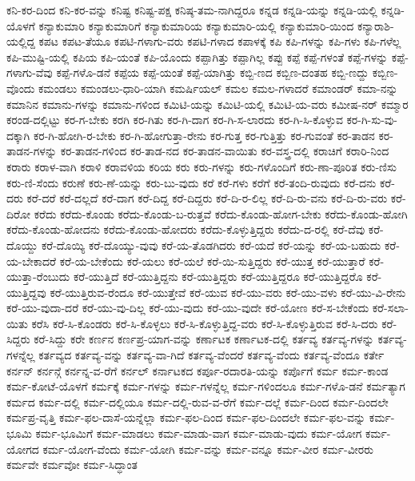 {ಕನಿ-ಕರ-ದಿಂದ
ಕನಿ-ಕರ-ವನ್ನು
ಕನಿಷ್ಟ
ಕನಿಷ್ಟ-ಪಕ್ಷ
ಕನಿಷ್ಠ-ತಮ-ನಾಗಿದ್ದರೂ
ಕನ್ನಡ
ಕನ್ನಡಿ-ಯನ್ನು
ಕನ್ನಡಿ-ಯಲ್ಲಿ
ಕನ್ನಡಿ-ಯೊಳಗೆ
ಕನ್ಯಾಕುಮಾರಿ
ಕನ್ಯಾಕುಮಾರಿಗೆ
ಕನ್ಯಾಕುಮಾರಿಯ
ಕನ್ಯಾಕುಮಾರಿ-ಯಲ್ಲಿ
ಕನ್ಯಾಕುಮಾರಿ-ಯಿಂದ
ಕನ್ಯಾರಾಶಿ-ಯಲ್ಲಿದ್ದ
ಕಪಟ
ಕಪಟ-ತೆಯೂ
ಕಪಟಿ-ಗಳಾಗು-ವರು
ಕಪಟಿ-ಗಳಾದ
ಕಪಾಳಕ್ಕೆ
ಕಪಿ
ಕಪಿ-ಗಳನ್ನು
ಕಪಿ-ಗಳು
ಕಪಿ-ಗಳೆಲ್ಲ
ಕಪಿ-ಮುಷ್ಟಿ-ಯಲ್ಲಿ
ಕಪಿಯ
ಕಪಿ-ಯಂತೆ
ಕಪಿ-ಯೊಂದು
ಕಪ್ಪಾಗಿತ್ತು
ಕಪ್ಪಾಗಿಲ್ಲ
ಕಪ್ಪು
ಕಪ್ಪೆ
ಕಪ್ಪೆ-ಗಳಂತೆ
ಕಪ್ಪೆ-ಗಳನ್ನು
ಕಪ್ಪೆ-ಗಳಾಗು-ವೆವು
ಕಪ್ಪೆ-ಗಳೊ-ಡನೆ
ಕಪ್ಪೆಯ
ಕಪ್ಪೆ-ಯಂತೆ
ಕಪ್ಪೆ-ಯಾಗಿತ್ತು
ಕಬ್ಬಿ-ಣದ
ಕಬ್ಬಿಣ-ದಂತಹ
ಕಬ್ಬಿ-ಣದ್ದು
ಕಬ್ಬಿಣ-ವೊಂದು
ಕಮಂಡಲು
ಕಮಂಡಲು-ಧಾರಿ-ಯಾಗಿ
ಕಮರ್ಷಿಯಲ್
ಕಮಲ
ಕಮಲ-ಗಳಾದರೆ
ಕಮಾಂಡರ್
ಕಮಾ-ನನ್ನು
ಕಮಾನಿನ
ಕಮಾನು-ಗಳನ್ನು
ಕಮಾನು-ಗಳಿಂದ
ಕಮಿಟಿ-ಯನ್ನು
ಕಮಿಟಿ-ಯಲ್ಲಿ
ಕಮಿಟಿ-ಯ-ವರು
ಕಮೀಷ-ನರ್
ಕಮ್ಮಾರ
ಕರಂಡ-ದಲ್ಲಿಟ್ಟು
ಕರ-ಗ-ಬೇಕು
ಕರಗಿ
ಕರ-ಗಿತು
ಕರ-ಗಿ-ದಾಗ
ಕರ-ಗಿ-ಸ-ಲಾರದು
ಕರ-ಗಿ-ಸಿ-ಕೊಳ್ಳುವ
ಕರ-ಗಿ-ಸು-ವು-ದಕ್ಕಾಗಿ
ಕರ-ಗಿ-ಹೋಗಿ-ರ-ಬೇಕು
ಕರ-ಗಿ-ಹೋಗುತ್ತಾ-ರೇನು
ಕರ-ಗುತ್ತ
ಕರ-ಗುತ್ತಿತ್ತು
ಕರ-ಗುವಂತೆ
ಕರ-ತಾಡನ
ಕರ-ತಾಡನ-ಗಳನ್ನು
ಕರ-ತಾಡನ-ಗಳಿಂದ
ಕರ-ತಾಡ-ನದ
ಕರ-ತಾಡನ-ವಾಯಿತು
ಕರ-ವಸ್ತ್ರ-ದಲ್ಲಿ
ಕರಾಚಿಗೆ
ಕರಾರಿ-ನಿಂದ
ಕರಾರು
ಕರಾಳ-ವಾಗಿ
ಕರಾಳಿ
ಕರಾವಳಿಯ
ಕರಿಯ
ಕರು
ಕರು-ಗಳನ್ನು
ಕರು-ಗಳೊಂದಿಗೆ
ಕರು-ಣಾ-ಪೂರಿತ
ಕರು-ಣಿಸು
ಕರು-ಣಿ-ಸೆಂದು
ಕರುಣೆ
ಕರು-ಣೆ-ಯನ್ನು
ಕರು-ಬು-ವುದು
ಕರೆ
ಕರೆ-ಗಳು
ಕರೆಗೆ
ಕರೆ-ತಂದಿ-ರುವುದು
ಕರೆ-ದನು
ಕರೆ-ದರು
ಕರೆ-ದರೆ
ಕರೆ-ದಲ್ಲದೆ
ಕರೆ-ದಾಗ
ಕರೆ-ದಿದ್ದ
ಕರೆ-ದಿದ್ದರು
ಕರೆ-ದಿ-ರ-ಲಿಲ್ಲ
ಕರೆ-ದಿ-ರು-ವನು
ಕರೆ-ದಿ-ರು-ವರು
ಕರೆ-ದಿರೋ
ಕರೆದು
ಕರೆದು-ಕೊಂಡು
ಕರೆದು-ಕೊಂಡು-ಬ-ರುತ್ತವೆ
ಕರೆದು-ಕೊಂಡು-ಹೋಗ-ಬೇಕು
ಕರೆದು-ಕೊಂಡು-ಹೋಗಿ
ಕರೆದು-ಕೊಂಡು-ಹೋದನು
ಕರೆದು-ಕೊಂಡು-ಹೋದರು
ಕರೆದು-ಕೊಳ್ಳುತ್ತಿದ್ದರು
ಕರೆದು-ದ-ರಲ್ಲಿ
ಕರೆ-ದೆವು
ಕರೆ-ದೊಯ್ದು
ಕರೆ-ದೊಯ್ಯಿ
ಕರೆ-ದೊಯ್ಯು-ವುವು
ಕರೆ-ಯ-ತೊಡಗಿದರು
ಕರೆ-ಯದೆ
ಕರೆ-ಯನ್ನು
ಕರೆ-ಯ-ಬಹುದು
ಕರೆ-ಯ-ಬೇಕಾದರೆ
ಕರೆ-ಯ-ಬೇಕೆಂದು
ಕರೆ-ಯಲು
ಕರೆ-ಯಲೆ
ಕರೆ-ಯಿ-ಸುತ್ತಿದ್ದರು
ಕರೆ-ಯುತ್ತ
ಕರೆ-ಯುತ್ತಾರೆ
ಕರೆ-ಯುತ್ತಾ-ರೆಂಬುದು
ಕರೆ-ಯುತ್ತಿದೆ
ಕರೆ-ಯುತ್ತಿದ್ದನು
ಕರೆ-ಯುತ್ತಿದ್ದರು
ಕರೆ-ಯುತ್ತಿದ್ದರೂ
ಕರೆ-ಯುತ್ತಿದ್ದರೊ
ಕರೆ-ಯುತ್ತಿದ್ದವು
ಕರೆ-ಯುತ್ತಿರುವ-ರೆಂದೂ
ಕರೆ-ಯುತ್ತೇವೆ
ಕರೆ-ಯುವ
ಕರೆ-ಯು-ವರು
ಕರೆ-ಯು-ವಳು
ಕರೆ-ಯು-ವಿ-ರೇನು
ಕರೆ-ಯು-ವುದಾ-ದರೆ
ಕರೆ-ಯು-ವು-ದಿಲ್ಲ
ಕರೆ-ಯು-ವುದು
ಕರೆ-ಯು-ವುದೇ
ಕರೆ-ಯೋಣ
ಕರೆ-ಸ-ಬೇಕೆಂದು
ಕರೆ-ಸಲಾ-ಯಿತು
ಕರೆಸಿ
ಕರೆ-ಸಿ-ಕೊಂಡರು
ಕರೆ-ಸಿ-ಕೊಳ್ಳಲು
ಕರೆ-ಸಿ-ಕೊಳ್ಳುತ್ತಿದ್ದ-ವರು
ಕರೆ-ಸಿ-ಕೊಳ್ಳುತ್ತಿರುವ
ಕರೆ-ಸಿ-ದರು
ಕರೆ-ಸಿದ್ದರು
ಕರೆ-ಸಿದ್ದು
ಕರೇ
ಕರ್ಣನ
ಕರ್ಣಪ್ರ-ಯಾಗ-ವನ್ನು
ಕರ್ಣಾಟಕ
ಕರ್ಣಾಟಕ-ದಲ್ಲಿ
ಕರ್ತವ್ಯ
ಕರ್ತವ್ಯ-ಗಳನ್ನು
ಕರ್ತವ್ಯ-ಗಳನ್ನೆಲ್ಲ
ಕರ್ತವ್ಯದ
ಕರ್ತವ್ಯ-ವನ್ನು
ಕರ್ತವ್ಯ-ವಾ-ಗಿದೆ
ಕರ್ತವ್ಯ-ವೆಂದರೆ
ಕರ್ತವ್ಯ-ವೆಂದು
ಕರ್ತವ್ಯ-ವೆಂದೂ
ಕರ್ತೇ
ಕರ್ನನ್
ಕರ್ನನ್ಗೆ
ಕರ್ನನ್ನ-ವ-ರೆಗೆ
ಕರ್ನಲ್
ಕರ್ನಾಟಕದ
ಕರ್ಪೂ-ರದಾರತಿ-ಯನ್ನು
ಕರ್ಪೊಗೆ
ಕರ್ಮ
ಕರ್ಮ-ಕಾಂಡ
ಕರ್ಮ-ಕೋಟೆ-ಯೊಳಗೆ
ಕರ್ಮಕ್ಕೆ
ಕರ್ಮ-ಗಳನ್ನು
ಕರ್ಮ-ಗಳನ್ನೆಲ್ಲ
ಕರ್ಮ-ಗಳಿಂದಲೂ
ಕರ್ಮ-ಗಳೊ-ಡನೆ
ಕರ್ಮತ್ಯಾಗ
ಕರ್ಮದ
ಕರ್ಮ-ದಲ್ಲಿ
ಕರ್ಮ-ದಲ್ಲಿಯೂ
ಕರ್ಮ-ದಲ್ಲಿ-ರುವ-ವ-ರೆಗೆ
ಕರ್ಮ-ದಲ್ಲೆ
ಕರ್ಮ-ದಿಂದ
ಕರ್ಮ-ದಿಂದಲೇ
ಕರ್ಮಪ್ರ-ವೃತ್ತಿ
ಕರ್ಮ-ಫಲ-ದಾಸೆ-ಯನ್ನೆಲ್ಲಾ
ಕರ್ಮ-ಫಲ-ದಿಂದ
ಕರ್ಮ-ಫಲ-ದಿಂದಲೇ
ಕರ್ಮ-ಫಲ-ವನ್ನು
ಕರ್ಮ-ಭೂಮಿ
ಕರ್ಮ-ಭೂಮಿಗೆ
ಕರ್ಮ-ಮಾಡಲು
ಕರ್ಮ-ಮಾಡು-ವಾಗ
ಕರ್ಮ-ಮಾಡು-ವುದು
ಕರ್ಮ-ಯೋಗ
ಕರ್ಮ-ಯೋಗದ
ಕರ್ಮ-ಯೋಗ-ವೆಂದು
ಕರ್ಮ-ಯೋಗಿ
ಕರ್ಮ-ವನ್ನು
ಕರ್ಮ-ವನ್ನೂ
ಕರ್ಮ-ವೀರ
ಕರ್ಮ-ವೀರರು
ಕರ್ಮವೇ
ಕರ್ಮವೋ
ಕರ್ಮ-ಸಿದ್ಧಾಂತ
}

